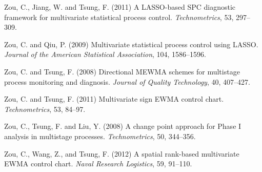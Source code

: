 \begin{thebibliography}{}
\item Zou, C., Jiang, W. and Tsung, F. (2011) A LASSO-based SPC diagnostic framework for
multivariate statistical process control. {\it Technometrics}, 53, 297--309.

\item Zou, C. and Qiu, P. (2009) Multivariate statistical process control using
LASSO. {\it Journal of the American Statistical Association}, 104, 1586--1596.

\item Zou, C. and Tsung, F. (2008) Directional MEWMA schemes for
multistage process monitoring and diagnosis. {\it Journal of Quality Technology},
40, 407--427.

\item Zou, C. and Tsung, F. (2011) Multivariate sign EWMA control
chart. {\it Technometrics}, 53, 84--97.

\item Zou, C., Tsung, F. and Liu, Y. (2008) A change point approach for Phase I
analysis in multistage processes. {\it Technometrics}, 50, 344--356.

\item Zou, C., Wang, Z., and Tsung, F. (2012) A spatial rank-based multivariate EWMA
control chart. {\it Naval Research Logistics}, 59, 91--110.

\end{thebibliography}
